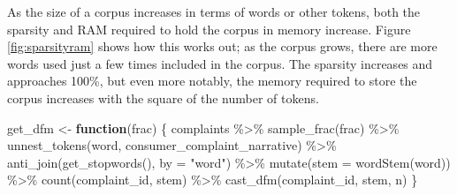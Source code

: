 \documentclass[
]{krantz}
\makeatletter
\newenvironment{Shaded}{\begin{snugshade}}{\end{snugshade}}
\newcommand{\AttributeTok}[1]{\textcolor[rgb]{0.77,0.63,0.00}{#1}}
\newcommand{\ControlFlowTok}[1]{\textcolor[rgb]{0.13,0.29,0.53}{\textbf{#1}}}
\newcommand{\FunctionTok}[1]{\textcolor[rgb]{0.00,0.00,0.00}{#1}}
\newcommand{\NormalTok}[1]{#1}
\newcommand{\OtherTok}[1]{\textcolor[rgb]{0.56,0.35,0.01}{#1}}
\newcommand{\SpecialCharTok}[1]{\textcolor[rgb]{0.00,0.00,0.00}{#1}}
\newcommand{\StringTok}[1]{\textcolor[rgb]{0.31,0.60,0.02}{#1}}
\newenvironment{kframe}{%
\medskip{}
\setlength{\fboxsep}{.8em}
 \def\at@end@of@kframe{}%
 \ifinner\ifhmode%
  \def\at@end@of@kframe{\end{minipage}}%
  \begin{minipage}{\columnwidth}%
 \fi\fi%
 \def\FrameCommand##1{\hskip\@totalleftmargin \hskip-\fboxsep
 \colorbox{shadecolor}{##1}\hskip-\fboxsep
     \hskip-\linewidth \hskip-\@totalleftmargin \hskip\columnwidth}%
 \MakeFramed {\advance\hsize-\width
   \@totalleftmargin\z@ \linewidth\hsize
   \@setminipage}}%
 {\par\unskip\endMakeFramed%
 \at@end@of@kframe}
\renewenvironment{Shaded}{\begin{kframe}}{\end{kframe}}
\makeatother
\begin{document}
As the size of a corpus increases in terms of words or other tokens, both the sparsity and RAM required to hold the corpus in memory increase. Figure \ref{fig:sparsityram} shows how this works out; as the corpus grows, there are more words used just a few times included in the corpus. The sparsity increases and approaches 100\%, but even more notably, the memory required to store the corpus increases with the square of the number of tokens.

\begin{Shaded}
\begin{Highlighting}[]
\NormalTok{get\_dfm }\OtherTok{\textless{}{-}} \ControlFlowTok{function}\NormalTok{(frac) \{}
\NormalTok{  complaints }\SpecialCharTok{\%\textgreater{}\%}
    \FunctionTok{sample\_frac}\NormalTok{(frac) }\SpecialCharTok{\%\textgreater{}\%}
    \FunctionTok{unnest\_tokens}\NormalTok{(word, consumer\_complaint\_narrative) }\SpecialCharTok{\%\textgreater{}\%}
    \FunctionTok{anti\_join}\NormalTok{(}\FunctionTok{get\_stopwords}\NormalTok{(), }\AttributeTok{by =} \StringTok{"word"}\NormalTok{) }\SpecialCharTok{\%\textgreater{}\%}
    \FunctionTok{mutate}\NormalTok{(}\AttributeTok{stem =} \FunctionTok{wordStem}\NormalTok{(word)) }\SpecialCharTok{\%\textgreater{}\%}
    \FunctionTok{count}\NormalTok{(complaint\_id, stem) }\SpecialCharTok{\%\textgreater{}\%}
    \FunctionTok{cast\_dfm}\NormalTok{(complaint\_id, stem, n)}
\NormalTok{\}}


\end{Highlighting}
\end{Shaded}
\end{document}
